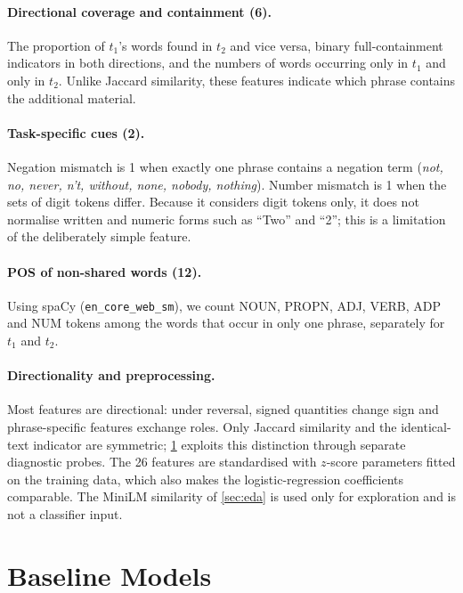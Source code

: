 \documentclass[11pt,a4paper]{article}
\begin{document}
\paragraph{Directional coverage and containment (6).} The proportion of $t_1$'s words found in $t_2$ and vice versa, binary full-containment indicators in both directions, and the numbers of words occurring only in $t_1$ and only in $t_2$. Unlike Jaccard similarity, these features indicate which phrase contains the additional material.

\paragraph{Task-specific cues (2).} Negation mismatch is 1 when exactly one phrase contains a negation term (\emph{not, no, never, n't, without, none, nobody, nothing}). Number mismatch is 1 when the sets of digit tokens differ. Because it considers digit tokens only, it does not normalise written and numeric forms such as ``Two'' and ``2''; this is a limitation of the deliberately simple feature.

\paragraph{POS of non-shared words (12).} Using spaCy (\texttt{en\_core\_web\_sm}), we count NOUN, PROPN, ADJ, VERB, ADP and NUM tokens among the words that occur in only one phrase, separately for $t_1$ and $t_2$.

\paragraph{Directionality and preprocessing.} Most features are directional: under reversal, signed quantities change sign and phrase-specific features exchange roles. Only Jaccard similarity and the identical-text indicator are symmetric; \cref{sec:baselines} exploits this distinction through separate diagnostic probes. The 26 features are standardised with $z$-score parameters fitted on the training data, which also makes the logistic-regression coefficients comparable. The MiniLM similarity of \cref{sec:eda} is used only for exploration and is not a classifier input.

\section{Baseline Models}
\label{sec:baselines}
\end{document}
